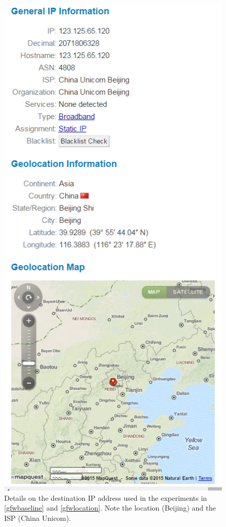 \begin{figure}
	\includegraphics[width=\columnwidth]{figures/gfwbaiduip}
	\caption{
		Details on the destination IP address used in the experiments in \autoref{gfwbaseline} and \autoref{gfwlocation}.
		Note the location (Beijing) and the ISP (China Unicom).
	}
	\label{fig_gfwbaiduip}
\end{figure}

